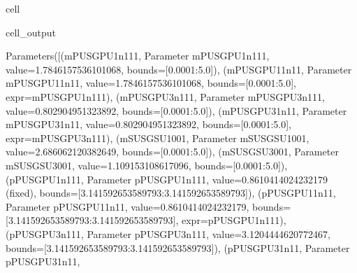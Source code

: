\documentclass[letterpaper,table,10pt,english]{jupyterBook}
\begin{document}
\begin{sphinxuseclass}{cell}
\begin{sphinxVerbatimOutput}
\begin{sphinxuseclass}{cell_output}
\begin{sphinxVerbatim}[commandchars=\\\{\}]
Parameters([(\PYGZsq{}m\PYGZus{}PU\PYGZus{}SG\PYGZus{}PU\PYGZus{}1\PYGZus{}n1\PYGZus{}1\PYGZus{}1\PYGZsq{}, \PYGZlt{}Parameter \PYGZsq{}m\PYGZus{}PU\PYGZus{}SG\PYGZus{}PU\PYGZus{}1\PYGZus{}n1\PYGZus{}1\PYGZus{}1\PYGZsq{}, value=1.7846157536101068, bounds=[0.0001:5.0]\PYGZgt{}), (\PYGZsq{}m\PYGZus{}PU\PYGZus{}SG\PYGZus{}PU\PYGZus{}1\PYGZus{}1\PYGZus{}n1\PYGZus{}1\PYGZsq{}, \PYGZlt{}Parameter \PYGZsq{}m\PYGZus{}PU\PYGZus{}SG\PYGZus{}PU\PYGZus{}1\PYGZus{}1\PYGZus{}n1\PYGZus{}1\PYGZsq{}, value=1.7846157536101068, bounds=[0.0001:5.0], expr=\PYGZsq{}m\PYGZus{}PU\PYGZus{}SG\PYGZus{}PU\PYGZus{}1\PYGZus{}n1\PYGZus{}1\PYGZus{}1\PYGZsq{}\PYGZgt{}), (\PYGZsq{}m\PYGZus{}PU\PYGZus{}SG\PYGZus{}PU\PYGZus{}3\PYGZus{}n1\PYGZus{}1\PYGZus{}1\PYGZsq{}, \PYGZlt{}Parameter \PYGZsq{}m\PYGZus{}PU\PYGZus{}SG\PYGZus{}PU\PYGZus{}3\PYGZus{}n1\PYGZus{}1\PYGZus{}1\PYGZsq{}, value=0.802904951323892, bounds=[0.0001:5.0]\PYGZgt{}), (\PYGZsq{}m\PYGZus{}PU\PYGZus{}SG\PYGZus{}PU\PYGZus{}3\PYGZus{}1\PYGZus{}n1\PYGZus{}1\PYGZsq{}, \PYGZlt{}Parameter \PYGZsq{}m\PYGZus{}PU\PYGZus{}SG\PYGZus{}PU\PYGZus{}3\PYGZus{}1\PYGZus{}n1\PYGZus{}1\PYGZsq{}, value=0.802904951323892, bounds=[0.0001:5.0], expr=\PYGZsq{}m\PYGZus{}PU\PYGZus{}SG\PYGZus{}PU\PYGZus{}3\PYGZus{}n1\PYGZus{}1\PYGZus{}1\PYGZsq{}\PYGZgt{}), (\PYGZsq{}m\PYGZus{}SU\PYGZus{}SG\PYGZus{}SU\PYGZus{}1\PYGZus{}0\PYGZus{}0\PYGZus{}1\PYGZsq{}, \PYGZlt{}Parameter \PYGZsq{}m\PYGZus{}SU\PYGZus{}SG\PYGZus{}SU\PYGZus{}1\PYGZus{}0\PYGZus{}0\PYGZus{}1\PYGZsq{}, value=2.686062120382649, bounds=[0.0001:5.0]\PYGZgt{}), (\PYGZsq{}m\PYGZus{}SU\PYGZus{}SG\PYGZus{}SU\PYGZus{}3\PYGZus{}0\PYGZus{}0\PYGZus{}1\PYGZsq{}, \PYGZlt{}Parameter \PYGZsq{}m\PYGZus{}SU\PYGZus{}SG\PYGZus{}SU\PYGZus{}3\PYGZus{}0\PYGZus{}0\PYGZus{}1\PYGZsq{}, value=1.109153108617096, bounds=[0.0001:5.0]\PYGZgt{}), (\PYGZsq{}p\PYGZus{}PU\PYGZus{}SG\PYGZus{}PU\PYGZus{}1\PYGZus{}n1\PYGZus{}1\PYGZus{}1\PYGZsq{}, \PYGZlt{}Parameter \PYGZsq{}p\PYGZus{}PU\PYGZus{}SG\PYGZus{}PU\PYGZus{}1\PYGZus{}n1\PYGZus{}1\PYGZus{}1\PYGZsq{}, value=\PYGZhy{}0.8610414024232179 (fixed), bounds=[\PYGZhy{}3.141592653589793:3.141592653589793]\PYGZgt{}), (\PYGZsq{}p\PYGZus{}PU\PYGZus{}SG\PYGZus{}PU\PYGZus{}1\PYGZus{}1\PYGZus{}n1\PYGZus{}1\PYGZsq{}, \PYGZlt{}Parameter \PYGZsq{}p\PYGZus{}PU\PYGZus{}SG\PYGZus{}PU\PYGZus{}1\PYGZus{}1\PYGZus{}n1\PYGZus{}1\PYGZsq{}, value=\PYGZhy{}0.8610414024232179, bounds=[\PYGZhy{}3.141592653589793:3.141592653589793], expr=\PYGZsq{}p\PYGZus{}PU\PYGZus{}SG\PYGZus{}PU\PYGZus{}1\PYGZus{}n1\PYGZus{}1\PYGZus{}1\PYGZsq{}\PYGZgt{}), (\PYGZsq{}p\PYGZus{}PU\PYGZus{}SG\PYGZus{}PU\PYGZus{}3\PYGZus{}n1\PYGZus{}1\PYGZus{}1\PYGZsq{}, \PYGZlt{}Parameter \PYGZsq{}p\PYGZus{}PU\PYGZus{}SG\PYGZus{}PU\PYGZus{}3\PYGZus{}n1\PYGZus{}1\PYGZus{}1\PYGZsq{}, value=\PYGZhy{}3.1204444620772467, bounds=[\PYGZhy{}3.141592653589793:3.141592653589793]\PYGZgt{}), (\PYGZsq{}p\PYGZus{}PU\PYGZus{}SG\PYGZus{}PU\PYGZus{}3\PYGZus{}1\PYGZus{}n1\PYGZus{}1\PYGZsq{}, \PYGZlt{}Parameter \PYGZsq{}p\PYGZus{}PU\PYGZus{}SG\PYGZus{}PU\PYGZus{}3\PYGZus{}1\PYGZus{}n1\PYGZus{}1\PYGZsq{}, 
\end{sphinxVerbatim}
\end{sphinxuseclass}
\end{sphinxVerbatimOutput}
\end{sphinxuseclass}
\end{document}
